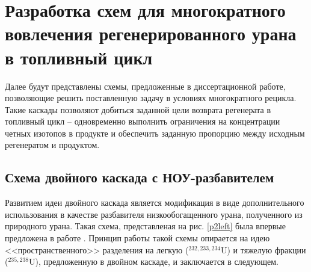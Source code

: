 \chapter{Разработка схем для многократного вовлечения регенерированного урана в топливный цикл}\label{ch:ch3}

Далее будут представлены схемы, предложенные в диссертационной работе, позволяющие решить поставленную задачу в условиях многократного рецикла. Такие каскады позволяют добиться заданной цели возврата регенерата в топливный цикл -- одновременно выполнить ограничения на концентрации четных изотопов в продукте и обеспечить заданную пропорцию между исходным регенератом и продуктом.


\section{Схема двойного каскада с НОУ-разбавителем}

Развитием идеи двойного каскада является модификация в виде дополнительного использования в качестве разбавителя низкообогащенного урана, полученного из природного урана. Такая схема, представленая на рис. \ref{p2left} была впервые предложена в работе \cite{vodolazskihSposobIzotopnogoVosstanovleniya2006}. Принцип работы такой схемы опирается на идею <<пространственного>> разделения на легкую ($^{232,233,234}$U) и тяжелую фракции ($^{235,238}$U), предложенную в двойном каскаде, и заключается в следующем. 

